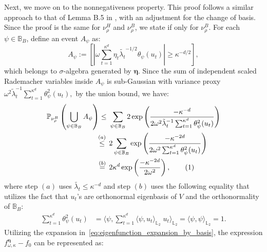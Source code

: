 \documentclass[twoside,11pt]{article}
\newcommand\numberthis{\addtocounter{equation}{1}\tag{\theequation}}
\newcommand{\Ell}{\mathbb{L}}
\newcommand{\EllTwo}{\Ell_2} %
\newcommand{\mP}{\mathbb{P}} %
\newcommand{\dimDensity}{d} %
\newcommand{\ONset}{\mathbb{B}}
\newcommand{\binNum}{\kappa}           %
\newcommand{\coef}{\theta}
\begin{document}
\begin{appendix}
	Next, we move on to the nonnegativeness property.
	This proof follows a similar approach to that of Lemma B.5 in \citet{Lam-Weil2021MinimaxConstraint}, with an adjustment for the change of basis. 
	Since the proof is the same for \( \nu_\rho^H \) and \( \nu_\rho^B \), we state if only for \( \nu_\rho^B \).
	For each \( \psi \in \ONset_{B} \), define an event \( A_{\psi} \) as:
	\[
	A_{\psi}:= \left[ \left| \omega \sum_{t=1}^{\binNum^{\dimDensity}} \eta_t \tilde{\lambda_t}^{-1/2} \coef_{\psi}(u_t) \right| \geq \binNum^{-\dimDensity/2} \right],
	\]
	which belongs to \( \sigma \)-algebra generated by \( \boldsymbol{\eta} \).
	Since the sum of independent scaled Rademacher variables inside $A_{\psi}$ is  sub-Gaussian  with variance proxy
	$
	\omega^2 \tilde{\lambda}_t^{-1} \sum_{t=1}^{\binNum^\dimDensity} \coef_\psi^2(u_t),
	$
	by the union bound, we have:
	\begin{align*}
		\mP_{\nu_\rho^B}
		\left( \bigcup_{\psi \in \ONset_{B}} A_{\psi} \right)
		\leq  ~ &
		\sum_{\psi \in \ONset_{B}}
		2 \exp
		\left(
		\frac{
			- \binNum^{-\dimDensity}}{
			2\omega^2 \tilde{\lambda}_t^{-1}
			\sum_{t=1}^{\binNum^\dimDensity}
			\coef_\psi^2(u_t)}
		\right)
		\\ \stackrel{(a)}{\leq} \hskip 1.57mm &
		2 \sum_{\psi \in \ONset_{B}} \exp \left( \frac{-\kappa^{-2\dimDensity}}{2 \omega^2 \sum_{t=1}^{\binNum^{\dimDensity}} \coef^2_{\psi}(u_t) } \right) 
		\\ \stackrel{(b)}{=} \hskip 1.57mm &
		2 \binNum^{\dimDensity} \exp \left( \frac{-\kappa^{-2\dimDensity}}{2 \omega^2 } \right),
		\numberthis
		\label{holder_union_bound}
	\end{align*}
	where step $(a)$ uses \( \tilde{\lambda_t} \leq \binNum^{-\dimDensity} \) and step $(b)$ uses the following equality that utilizes the fact that $u_t$'s are orthonormal eigenbasis of $V$ and the orthonormality of $\ONset_{B}$:
	\begin{align*}
		\sum_{t=1}^{\binNum^{\dimDensity}} \coef^2_{\psi}(u_t) 
		&=
		\langle
		\psi,
		\sum_{t=1}^{\binNum^\dimDensity} \langle \psi, u_t \rangle_{\EllTwo} \; 
		u_t
		\rangle_{\EllTwo}
		=
		\langle \psi, \psi \rangle_{\EllTwo} = 1.
	\end{align*}
	Utilizing the  expansion in~\eqref{eq:eigenfunction_expansion_by_basis}, the expression \( f^{\boldsymbol{\eta}}_{\omega, \binNum} - f_0 \) can be represented as:

\end{appendix}
\end{document}
